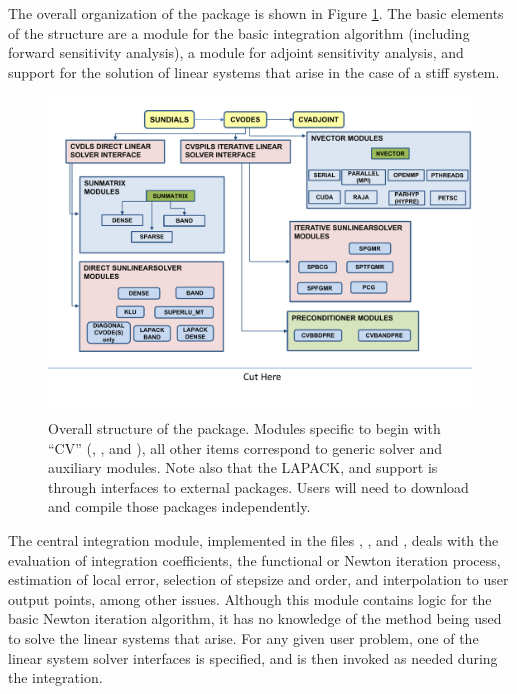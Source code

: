 The overall organization of the {\cvodes} package is shown in Figure
\ref{f:cvsorg}.  The basic elements of the structure are a module for
the basic integration algorithm (including forward sensitivity analysis),
a module for adjoint sensitivity analysis, and support for the solution
of linear systems that arise in the case of a stiff system.  
\begin{figure}
{\centerline{\includegraphics[width=\textwidth]{cvsorg}}}
\caption [Overall structure of the CVODES package]
{Overall structure of the {\cvodes} package.
  Modules specific to {\cvodes} begin with ``CV'' ({\cvdls},
  {\cvspils}, {\cvbbdpre} and {\cvbandpre}), all other items correspond
  to generic solver and auxiliary modules. 
  Note also that the LAPACK, {\klu} and {\superlumt} support is
  through interfaces to external packages.  Users will need to
  download and compile those packages independently.}
\label{f:cvsorg}
\end{figure}
The central integration module, implemented in the files ,
, and , deals with the evaluation of integration
coefficients, the functional or Newton iteration process, estimation of local
error, selection of stepsize and order, and interpolation to user output
points, among other issues.  Although this module contains logic for
the basic Newton iteration algorithm, it has no knowledge of the
method being used to solve the linear systems that arise.  For any
given user problem, one of the linear system solver interfaces is
specified, and is then invoked as needed during the integration. 

